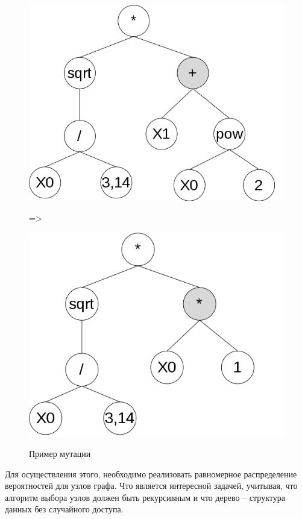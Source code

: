 \clearpage
\begin{figure}[!h]
\centering
\includegraphics[scale=0.7]{research/pics/8.png}

=>

\includegraphics[scale=0.7]{research/pics/9.png}
\label{figure:mutation}
\caption{Пример мутации}
\end{figure}

Для осуществления этого, необходимо реализовать равномерное распределение вероятностей для узлов графа. Что является интересной задачей, учитывая, что алгоритм выбора узлов должен быть рекурсивным и что дерево – структура данных без случайного доступа. 


